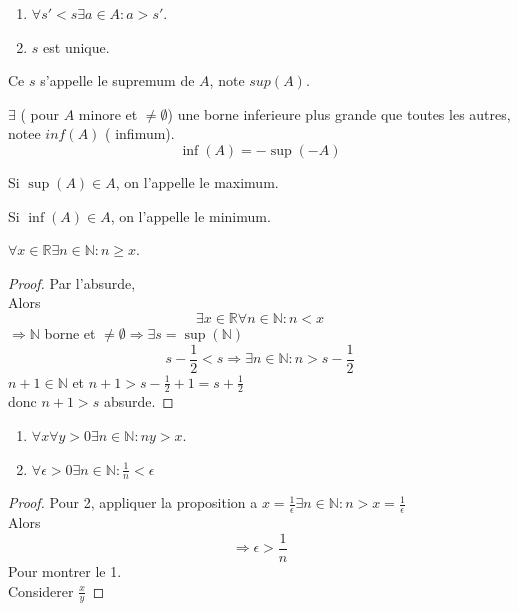 \documentclass[../main.tex]{subfiles}
\begin{document}
\begin{rmq}
\begin{enumerate}
\item $\forall s'<s \exists a \in A: a> s'$.\\
\item $s$ est unique.
\end{enumerate}
\end{rmq}
\begin{defn}[Supremum]\label{defn:supremum}
	Ce $s$ s'appelle le supremum de $A$, note $sup(A)$.	
\end{defn}
\begin{rmq}
	$\exists$ ( pour $A$ minore et $\neq \emptyset$) une borne inferieure plus grande que toutes les autres, notee $inf(A)$ ( infimum).
	\[ 
		\inf(A) = - \sup ( -A)
	\]
\end{rmq}
\begin{rmq}
	Si $\sup ( A) \in A$, on l'appelle le maximum.
\end{rmq}
\begin{rmq}
	Si $\inf ( A) \in A$, on l'appelle le minimum.
\end{rmq}
\begin{propo}
$\forall x \in \mathbb{R} \exists n \in \mathbb{N}: n \geq x$.\\
\end{propo}
\begin{proof}
Par l'absurde,\\
Alors 
\[ 
\exists x \in \mathbb{R} \forall n \in \mathbb{N}: n < x
\]
$\Rightarrow \mathbb{N}$ borne et  $\neq \emptyset \Rightarrow \exists s = \sup (\mathbb{N}) $ \\
\[ 
s - \frac{1}{2} < s \Rightarrow  \exists n \in \mathbb{N}: n > s - \frac{1}{2}
\]
$n+1 \in \mathbb{N}$ et $n+1 > s - \frac{1}{2} + 1 = s + \frac{1}{2}$ \\
donc $n+1 > s$ absurde.
\end{proof}
\begin{crly}
\begin{enumerate}
	\item $\forall x \forall y > 0 \exists n \in \mathbb{N}: ny > x$.\\
	\item $\forall \epsilon > 0 \exists n \in \mathbb{N}: \frac{1}{n} < \epsilon$
\end{enumerate}
\end{crly}
\begin{proof}
	Pour 2, appliquer la proposition a $x = \frac{1}{\epsilon} \exists n \in \mathbb{N}: n > x = \frac{1}{\epsilon}$\\
	Alors
	\[ 
	\Rightarrow \epsilon > \frac{1}{n}	
	\]
	Pour montrer le 1.\\
	Considerer $\frac{x}{y}$
\end{proof}
\end{document}
